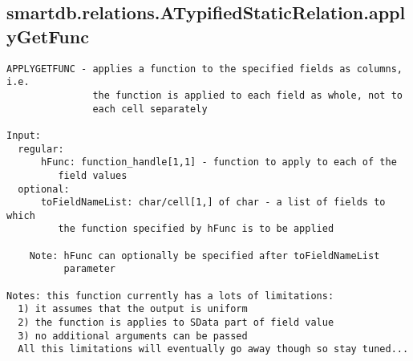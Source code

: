 \subsection{\texorpdfstring{smartdb.relations.ATypifiedStaticRelation.applyGetFunc}{applyGetFunc}}\label{method:smartdb.relations.ATypifiedStaticRelation.applyGetFunc}
\begin{verbatim}
APPLYGETFUNC - applies a function to the specified fields as columns, i.e.
               the function is applied to each field as whole, not to
               each cell separately

Input:
  regular:
      hFunc: function_handle[1,1] - function to apply to each of the
         field values
  optional:
      toFieldNameList: char/cell[1,] of char - a list of fields to which
         the function specified by hFunc is to be applied

    Note: hFunc can optionally be specified after toFieldNameList
          parameter

Notes: this function currently has a lots of limitations:
  1) it assumes that the output is uniform
  2) the function is applies to SData part of field value
  3) no additional arguments can be passed
  All this limitations will eventually go away though so stay tuned...
\end{verbatim}
